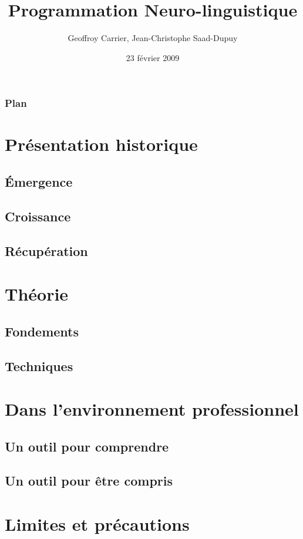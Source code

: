 \documentclass{beamer}
\title{Programmation Neuro-linguistique}
\author{Geoffroy Carrier, Jean-Christophe Saad-Dupuy}
\institute{Université Joseph Fourier, L3 MIAGE}
\date{23 février 2009}
\begin{document}
\frame{\titlepage}

\begin{frame}
\frametitle{Plan}
\tableofcontents
\end{frame}

\section{Présentation historique}
\subsection{Émergence}
\subsection{Croissance}
\subsection{Récupération}

\section{Théorie}
\subsection{Fondements}
\subsection{Techniques}

\section{Dans l'environnement professionnel}
\subsection{Un outil pour comprendre}
\subsection{Un outil pour être compris}

\section{Limites et précautions}
\end{document}
